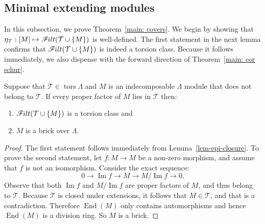\documentclass[ALCO,ThmDefs,Unicode,epreuves]{cedram}
\DeclareMathOperator{\tors}{tors}
\DeclareMathOperator{\image}{Im}
\DeclareMathOperator{\End}{End}
\newcommand{\calT}{\mathcal{T}}
\newcommand{\filt}{\mathscr{F}\Mk ilt}
\renewcommand{\1}{\hat{1}}
\newcommand{\0}{\hat{0}}
\newcommand*{\Mk}{\mkern -2mu}
\begin{document}
\subsection{Minimal extending modules}\label{proof sec}
In this subsection, we prove Theorem~\ref{main: covers}.
We begin by showing that $\eta_\calT: [M]\mapsto \filt(\calT \cup \{M\})$ is well-defined.
The first statement in the next lemma confirms that $\filt(\calT \cup \{M\})$ is indeed a torsion class.
Because it follows immediately, we also dispense with the forward direction of Theorem~\ref{main: cor schur}.
\begin{lemma}\label{lem: torsion and schur}
Suppose that $\calT\in \tors \Lambda$ and $M$ is an indecomposable $\Lambda$ module that does not belong to $\calT$.
If every proper factor of $M$ lies in $\calT$ then:
\begin{enumerate}
\item $\filt(\calT \cup \{M\})$ is a torsion class and
\item $M$ is a brick over $\Lambda$.
\end{enumerate}
\end{lemma}
\begin{proof}
The first statement follows immediately from Lemma~\ref{lem-epi-closure}.
To prove the second statement, let $f:M\rightarrow M$ be a non-zero morphism, and assume that $f$ is not an isomorphism.
Consider the exact sequence:
$$
0\rightarrow \image f\rightarrow M\rightarrow M/\image f\rightarrow 0.
$$
Observe that both $\image f$ and $M/\image f$ are proper factors of $M$, and thus belong to $\calT$.
Because $\calT$ is closed under extensions, it follows that $M\in\calT$, and that is a contradiction.
Therefore $\End(M)$ only contains automorphisms
and hence $\End(M)$ is a division ring. So $M$ is a brick.
\end{proof}
\end{document}
